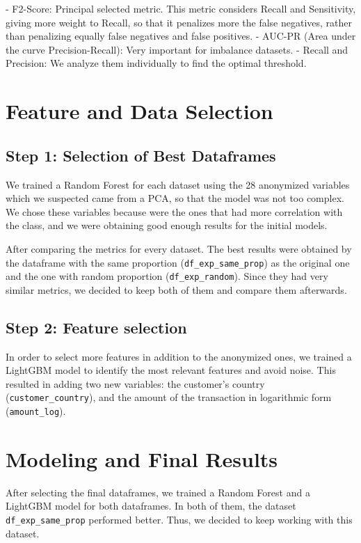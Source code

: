 \documentclass[12pt,a4paper]{report}
\begin{document}
\begin{description}
    - F2-Score: Principal selected metric. This metric considers Recall and Sensitivity, giving more weight to Recall, so that it penalizes more the false negatives, rather than penalizing equally false negatives and false positives.
    \newline
    - AUC-PR (Area under the curve Precision-Recall): Very important for imbalance datasets.
    \newline
    - Recall and Precision: We analyze them individually to find the optimal threshold.
\end{description}

\section{Feature and Data Selection}

\subsection{Step 1: Selection of Best Dataframes}
We trained a Random Forest for each dataset using the 28 anonymized variables which we suspected came from a PCA, so that the model was not too complex. We chose these variables because were the ones that had more correlation with the class, and we were obtaining good enough results for the initial models.

After comparing the metrics for every dataset. The best results were obtained by the dataframe with the same proportion (\texttt{df\_exp\_same\_prop}) as the original one and the one with random proportion (\texttt{df\_exp\_random}). Since they had very similar metrics, we decided to keep both of them and compare them afterwards.

\subsection{Step 2: Feature selection}
In order to select more features in addition to the anonymized ones, we trained a LightGBM model to identify the most relevant features and avoid noise. This resulted in adding two new variables: the customer’s country (\texttt{customer\_country}), and the amount of the transaction in logarithmic form (\texttt{amount\_log}).

\section{Modeling and Final Results}
After selecting the final dataframes, we trained a Random Forest and a LightGBM model for both dataframes. In both of them, the dataset \texttt{df\_exp\_same\_prop} performed better. Thus, we decided to keep working with this dataset.
\end{document}
